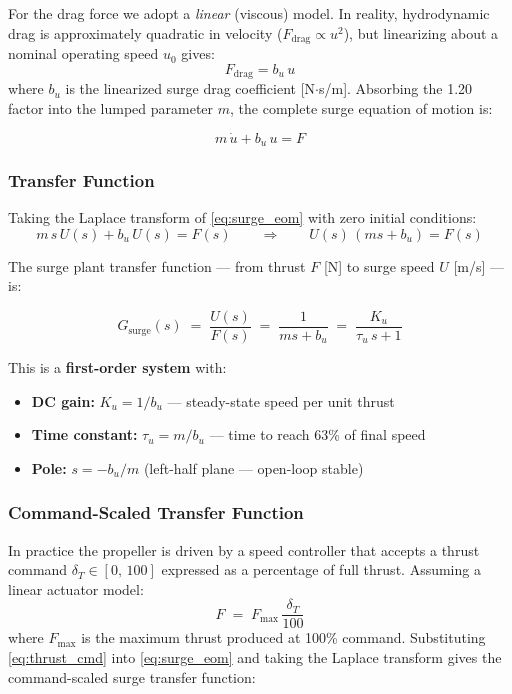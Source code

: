 \documentclass[11pt]{article}
\begin{document}
For the drag force we adopt a \emph{linear} (viscous) model.  In reality,
hydrodynamic drag is approximately quadratic in velocity
($F_{\mathrm{drag}} \propto u^2$), but linearizing about a nominal operating
speed $u_0$ gives:
\[
  F_{\mathrm{drag}} = b_u\,u
\]
where $b_u$ is the linearized surge drag coefficient [N$\cdot$s/m].
Absorbing the 1.20 factor into the lumped parameter $m$, the complete
surge equation of motion is:

\begin{equation}
  \boxed{m\,\dot{u} + b_u\,u = F}
  \label{eq:surge_eom}
\end{equation}

\subsubsection{Transfer Function}

Taking the Laplace transform of \eqref{eq:surge_eom} with zero initial
conditions:
\[
  m\,s\,U(s) + b_u\,U(s) = F(s)
  \qquad\Longrightarrow\qquad
  U(s)\,(ms + b_u) = F(s)
\]

The surge plant transfer function --- from thrust $F$ [N] to surge speed
$U$ [m/s] --- is:

\begin{equation}
  G_{\mathrm{surge}}(s)
  \;=\; \frac{U(s)}{F(s)}
  \;=\; \frac{1}{ms + b_u}
  \;=\; \frac{K_u}{\tau_u\,s + 1}
  \label{eq:Gsurge}
\end{equation}

This is a \textbf{first-order system} with:

\begin{itemize}
  \item \textbf{DC gain:} \;$K_u = 1/b_u$ \;[m\,s$^{-1}$/N]
        --- steady-state speed per unit thrust
  \item \textbf{Time constant:} \;$\tau_u = m/b_u$ \;[s]
        --- time to reach 63\% of final speed
  \item \textbf{Pole:} \;$s = -b_u/m$ \;(left-half plane --- open-loop stable)
\end{itemize}

\subsubsection{Command-Scaled Transfer Function}

In practice the propeller is driven by a speed controller that accepts a
thrust command $\delta_T \in [0,\,100]$ expressed as a percentage of full
thrust.  Assuming a linear actuator model:
\begin{equation}
  F \;=\; F_{\max}\,\frac{\delta_T}{100}
  \label{eq:thrust_cmd}
\end{equation}
where $F_{\max}$ is the maximum thrust produced at 100\% command.
Substituting \eqref{eq:thrust_cmd} into \eqref{eq:surge_eom} and taking the
Laplace transform gives the command-scaled surge transfer function:
\end{document}
